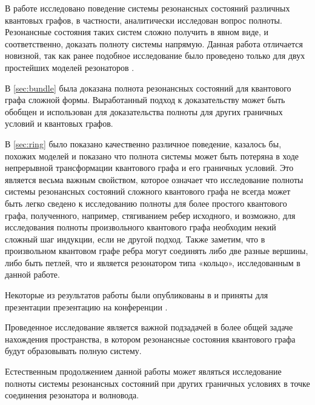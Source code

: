 \startconclusionpage

В работе исследовано поведение системы резонансных состояний различных квантовых графов, в частности, аналитически исследован вопрос полноты. Резонансные состояния таких систем сложно получить в явном виде, и соответственно, доказать полноту системы напрямую. Данная работа отличается новизной, так как ранее подобное исследование было проведено только для двух простейших моделей резонаторов \cite{spectralpavlov16}.

В \autoref{sec:bundle} была доказана полнота резонансных состояний для квантового графа сложной формы. Выработанный подход к доказательству может быть обобщен и использован для доказательства полноты для других граничных условий и квантовых графов.

В \autoref{sec:ring} было показано качественно различное поведение, казалось бы, похожих моделей и показано что полнота системы может быть потеряна в ходе непрерывной трансформации квантового графа и его граничных условий. Это является весьма важным свойством, которое означает что исследование полноты системы резонансных состояний сложного квантового графа не всегда может быть легко сведено к исследованию полноты для более простого квантового графа, полученного, например, стягиванием ребер исходного, и возможно, для исследования полноты произвольного квантового графа необходим некий сложный шаг индукции, если не другой подход. Также заметим, что в произвольном квантовом графе ребра могут соединять либо две разные вершины, либо быть петлей, что и является резонатором типа «кольцо», исследованным в данной работе. 

Некоторые из результатов работы были опубликованы в \cite{sbornik} и приняты для презентации презентацию на конференции \cite{diffdays}.

Проведенное исследование является важной подзадачей в более общей задаче нахождения пространства, в котором резонансные состояния квантового графа будут образовывать полную систему.

Естественным продолжением данной работы может являться исследование полноты системы резонансных состояний при других граничных условиях в точке соединения резонатора и волновода.